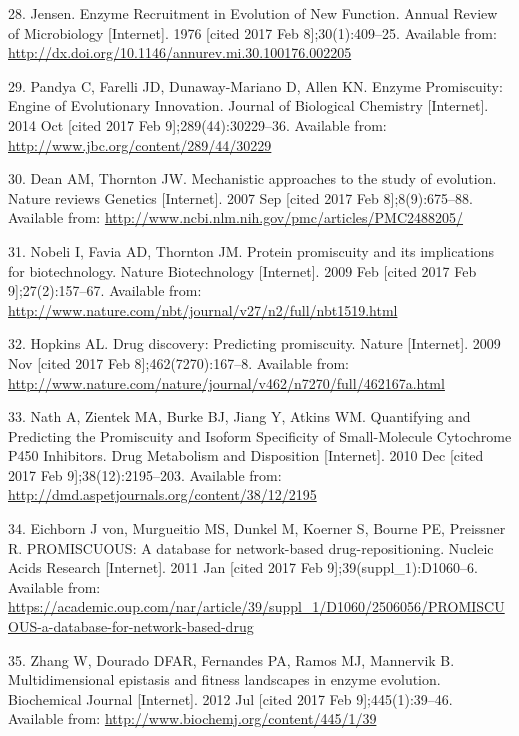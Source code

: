 \documentclass[12pt,twoside]{reedthesis}
\begin{document}
  \hypertarget{ref-jensen_enzyme_1976}{}
  28. Jensen. Enzyme Recruitment in Evolution of New Function. Annual
  Review of Microbiology {[}Internet{]}. 1976 {[}cited 2017 Feb
  8{]};30(1):409--25. Available from:
  \url{http://dx.doi.org/10.1146/annurev.mi.30.100176.002205}
  
  \hypertarget{ref-pandya_enzyme_2014}{}
  29. Pandya C, Farelli JD, Dunaway-Mariano D, Allen KN. Enzyme
  Promiscuity: Engine of Evolutionary Innovation. Journal of Biological
  Chemistry {[}Internet{]}. 2014 Oct {[}cited 2017 Feb
  9{]};289(44):30229--36. Available from:
  \url{http://www.jbc.org/content/289/44/30229}
  
  \hypertarget{ref-dean_mechanistic_2007}{}
  30. Dean AM, Thornton JW. Mechanistic approaches to the study of
  evolution. Nature reviews Genetics {[}Internet{]}. 2007 Sep {[}cited
  2017 Feb 8{]};8(9):675--88. Available from:
  \url{http://www.ncbi.nlm.nih.gov/pmc/articles/PMC2488205/}
  
  \hypertarget{ref-nobeli_protein_2009}{}
  31. Nobeli I, Favia AD, Thornton JM. Protein promiscuity and its
  implications for biotechnology. Nature Biotechnology {[}Internet{]}.
  2009 Feb {[}cited 2017 Feb 9{]};27(2):157--67. Available from:
  \url{http://www.nature.com/nbt/journal/v27/n2/full/nbt1519.html}
  
  \hypertarget{ref-hopkins_drug_2009}{}
  32. Hopkins AL. Drug discovery: Predicting promiscuity. Nature
  {[}Internet{]}. 2009 Nov {[}cited 2017 Feb 8{]};462(7270):167--8.
  Available from:
  \url{http://www.nature.com/nature/journal/v462/n7270/full/462167a.html}
  
  \hypertarget{ref-nath_quantifying_2010}{}
  33. Nath A, Zientek MA, Burke BJ, Jiang Y, Atkins WM. Quantifying and
  Predicting the Promiscuity and Isoform Specificity of Small-Molecule
  Cytochrome P450 Inhibitors. Drug Metabolism and Disposition
  {[}Internet{]}. 2010 Dec {[}cited 2017 Feb 9{]};38(12):2195--203.
  Available from: \url{http://dmd.aspetjournals.org/content/38/12/2195}
  
  \hypertarget{ref-von_eichborn_promiscuous:_2011}{}
  34. Eichborn J von, Murgueitio MS, Dunkel M, Koerner S, Bourne PE,
  Preissner R. PROMISCUOUS: A database for network-based
  drug-repositioning. Nucleic Acids Research {[}Internet{]}. 2011 Jan
  {[}cited 2017 Feb 9{]};39(suppl\_1):D1060--6. Available from:
  \url{https://academic.oup.com/nar/article/39/suppl_1/D1060/2506056/PROMISCUOUS-a-database-for-network-based-drug}
  
  \hypertarget{ref-zhang_multidimensional_2012}{}
  35. Zhang W, Dourado DFAR, Fernandes PA, Ramos MJ, Mannervik B.
  Multidimensional epistasis and fitness landscapes in enzyme evolution.
  Biochemical Journal {[}Internet{]}. 2012 Jul {[}cited 2017 Feb
  9{]};445(1):39--46. Available from:
  \url{http://www.biochemj.org/content/445/1/39}
  
\end{document}
